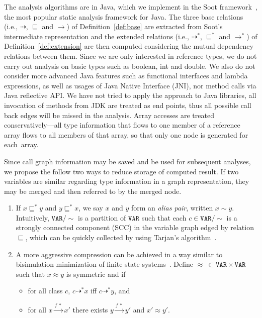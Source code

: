 \documentclass{llncs}
\newcommand\Var{\mathtt{VAR}}
\newcommand{\less}{\sqsubseteq}
\newcommand{\tflow}{\dashrightarrow}
\newcommand{\hflow}{\longrightarrow}
\newcommand{\lhflow}[1]{\stackrel{#1}{\hflow}}
\begin{document}
The analysis algorithms are in Java, which we implement in the Soot framework~\cite{soot}, the most popular static analysis framework for Java. The three base relations (i.e., $\tflow$, $\less$ and $\rightarrow$) of Definition~\ref{def:base} are extracted from Soot's intermediate representation and the extended relations (i.e., $\tflow^*$, $\less^*$ and $\rightarrow^*$) of Definition~\ref{def:extension} are then computed considering the mutual dependency relations between them. Since we are only interested in reference types, we do not carry out analysis on basic types such as \textsf{boolean}, \textsf{int} and \textsf{double}. We also do not consider more advanced Java features such as functional interfaces and lambda expressions, as well as usages of Java Native Interface (JNI), nor method calls via Java reflective API. We have not tried to apply the approach to Java libraries, all invocation of methods from JDK are treated as end points, thus all possible call back edges will be missed in the analysis.
%
Array accesses are treated conservatively---all type information that flows to one member of a reference array flows to all members of that array, so that only one node is generated for each~array.

Since call graph information may be saved and be used for subsequent analyses, we propose the follow two ways to reduce storage of computed result. If two variables are similar regarding type information in a graph representation, they may be merged and then referred to by the merged node.

\begin{enumerate}
  \item If $x\less^*y$ and $y\less^*x$, we say $x$ and $y$ form an \emph{alias pair}, written $x\sim y$. Intuitively, $\Var/\sim$ is a partition of $\Var$ such that each $c\in\Var/\sim$ is a strongly connected component (SCC) in the variable graph edged by relation $\less$, which can be quickly collected by using Tarjan's algorithm~\cite{Tarjan72}.
  \item A more aggressive compression can be achieved in a way similar to bisimulation minimization of finite state systems~\cite{Kanellakis90,Paige87}. Define $\approx\ \subset\Var\times\Var$ such that $x\approx y$ is symmetric and if
      \begin{itemize}
      \item for all class $c$, $c\tflow^* x$ iff $c\tflow^*y$, and
      \item for all $x\lhflow{f\ *}x'$ there exists $y\lhflow{f\ *}y'$ and $x'\approx y'$.
      \end{itemize}
\end{enumerate}
\end{document}
